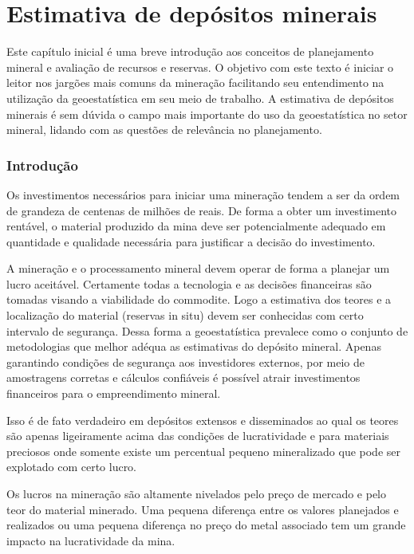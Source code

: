 

\chapter{Estimativa de depósitos minerais}



Este capítulo inicial é uma breve introdução aos conceitos de planejamento mineral e avaliação de recursos e reservas. O objetivo com este texto é iniciar o leitor nos jargões mais comuns da mineração facilitando seu entendimento na utilização da geoestatística em seu meio de trabalho. A estimativa de depósitos minerais é sem dúvida o campo mais importante do uso da geoestatística no setor mineral, lidando com as questões de relevância no planejamento.   

\subsection{Introdução}

Os investimentos necessários para iniciar uma mineração tendem a ser da ordem de grandeza de centenas de milhões de reais. De forma a obter um investimento rentável, o material produzido da mina deve ser potencialmente adequado em quantidade e qualidade necessária para justificar a decisão do investimento.

 A mineração e o processamento mineral devem operar de forma a planejar um lucro aceitável. Certamente todas a tecnologia e as decisões financeiras são tomadas visando a viabilidade do commodite. Logo a estimativa dos teores e a localização do material (reservas in situ) devem ser conhecidas com certo intervalo de segurança. Dessa forma a geoestatística prevalece como o conjunto de metodologias que melhor adéqua as estimativas do depósito mineral.  Apenas garantindo condições de segurança aos investidores externos, por meio de amostragens corretas e cálculos confiáveis é possível atrair investimentos financeiros para o empreendimento mineral. 
 
Isso é de fato verdadeiro em depósitos extensos e disseminados ao qual os teores são apenas ligeiramente acima das condições de lucratividade e para materiais preciosos onde somente existe um percentual pequeno mineralizado que pode ser explotado com certo lucro. 
 
 Os lucros na mineração são altamente nivelados pelo preço de mercado e pelo teor do material minerado. Uma pequena diferença entre os valores planejados e realizados ou uma pequena diferença no preço do metal associado tem um grande impacto na lucratividade da mina. 
 
